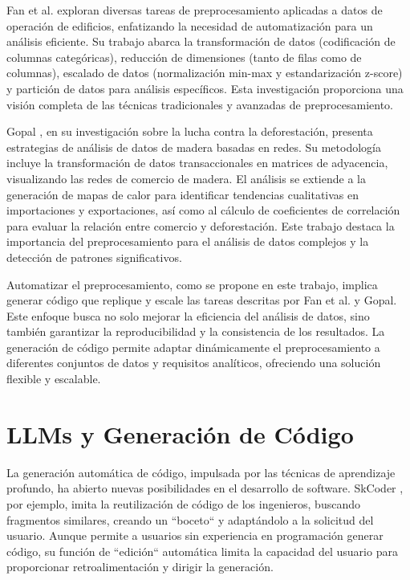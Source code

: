 Fan et al. \cite{fan2021review} exploran diversas tareas de preprocesamiento aplicadas a datos de operación de edificios, enfatizando la necesidad de automatización para un análisis eficiente. Su trabajo abarca la transformación de datos (codificación de columnas categóricas), reducción de dimensiones (tanto de filas como de columnas), escalado de datos (normalización min-max y estandarización z-score) y partición de datos para análisis específicos. Esta investigación proporciona una visión completa de las técnicas tradicionales y avanzadas de preprocesamiento.

Gopal \cite{gopal2022network}, en su investigación sobre la lucha contra la deforestación, presenta estrategias de análisis de datos de madera basadas en redes. Su metodología incluye la transformación de datos transaccionales en matrices de adyacencia, visualizando las redes de comercio de madera. El análisis se extiende a la generación de mapas de calor para identificar tendencias cualitativas en importaciones y exportaciones, así como al cálculo de coeficientes de correlación para evaluar la relación entre comercio y deforestación. Este trabajo destaca la importancia del preprocesamiento para el análisis de datos complejos y la detección de patrones significativos.

Automatizar el preprocesamiento, como se propone en este trabajo, implica generar código que replique y escale las tareas descritas por Fan et al. y Gopal. Este enfoque busca no solo mejorar la eficiencia del análisis de datos, sino también garantizar la reproducibilidad y la consistencia de los resultados. La generación de código permite adaptar dinámicamente el preprocesamiento a diferentes conjuntos de datos y requisitos analíticos, ofreciendo una solución flexible y escalable.

\section{LLMs y Generación de Código}

La generación automática de código, impulsada por las técnicas de aprendizaje profundo, ha abierto nuevas posibilidades en el desarrollo de software. SkCoder \cite{li2023skcoder}, por ejemplo, imita la reutilización de código de los ingenieros, buscando fragmentos similares, creando un ``boceto`` y adaptándolo a la solicitud del usuario. Aunque permite a usuarios sin experiencia en programación generar código, su función de ``edición`` automática limita la capacidad del usuario para proporcionar retroalimentación y dirigir la generación.

